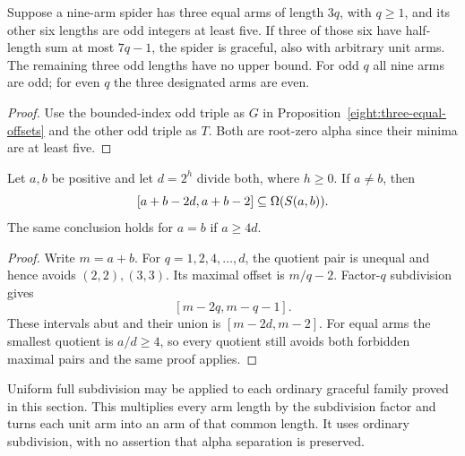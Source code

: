 \begin{corollary}\label{eight:nine-family}
Suppose a nine-arm spider has three equal arms of length $3q$, with
$q\ge1$, and its other six lengths are odd integers at least five.
If three of those six have half-length sum at most $7q-1$, the spider
is graceful, also with arbitrary unit arms.  The remaining three odd
lengths have no upper bound.  For odd $q$ all nine arms are odd; for
even $q$ the three designated arms are even.
\end{corollary}
\begin{proof}
Use the bounded-index odd triple as $G$ in
Proposition~\ref{eight:three-equal-offsets} and the other odd triple as
$T$.  Both are root-zero alpha since their minima are at least five.
\end{proof}

\begin{proposition}\label{eight:dyadic-pair-band}
Let $a,b$ be positive and let $d=2^h$ divide both, where $h\ge0$.
If $a\ne b$, then
\[
 [a+b-2d,a+b-2]\subseteq\Omega(S\!\left(a,b\right)).
\]
The same conclusion holds for $a=b$ if $a\ge4d$.
\end{proposition}
\begin{proof}
Write $m=a+b$.  For $q=1,2,4,\ldots,d$, the quotient pair is unequal
and hence avoids $(2,2),(3,3)$.  Its maximal offset is $m/q-2$.
Factor-$q$ subdivision gives
\[
 [m-2q,m-q-1].
\]
These intervals abut and their union is $[m-2d,m-2]$.
For equal arms the smallest quotient is $a/d\ge4$, so every quotient
still avoids both forbidden maximal pairs and the same proof applies.
\end{proof}

Uniform full subdivision may be applied to each ordinary graceful
family proved in this section.  This multiplies every arm length by
the subdivision factor and turns each unit arm into an arm of that
common length.  It uses ordinary subdivision, with no assertion that
alpha separation is preserved.
